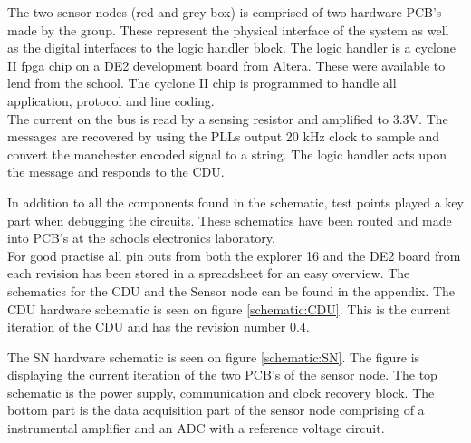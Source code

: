 The two sensor nodes (red and grey box) is comprised of two hardware PCB's made by the group. These represent the physical interface of the system as well as the digital interfaces to the logic handler block. The logic handler is a cyclone II fpga chip on a DE2 development board from Altera. These were available to lend from the school. The cyclone II chip is programmed to handle all application, protocol and line coding.\\
The current on the bus is read by a sensing resistor and amplified to 3.3V. The messages are recovered by using the PLLs output 20 kHz clock to sample and convert the manchester encoded signal to a string. The logic handler acts upon the message and responds to the CDU.

In addition to all the components found in the schematic, test points played a key part when debugging the circuits. These schematics have been routed and made into PCB's at the schools electronics laboratory.\\
For good practise all pin outs from both the explorer 16 and the DE2 board from each revision has been stored in a spreadsheet for an easy overview.
The schematics for the CDU and the Sensor node can be found in the appendix.
The CDU hardware schematic is seen on figure \ref{schematic:CDU}. This is the current iteration of the CDU and has the revision number 0.4.

The SN hardware schematic is seen on figure \ref{schematic:SN}. The figure is displaying the current iteration of the two PCB's of the sensor node. The top schematic is the power supply, communication and clock recovery block. The bottom part is the data acquisition part of the sensor node comprising of a instrumental amplifier and an ADC with a reference voltage circuit.

